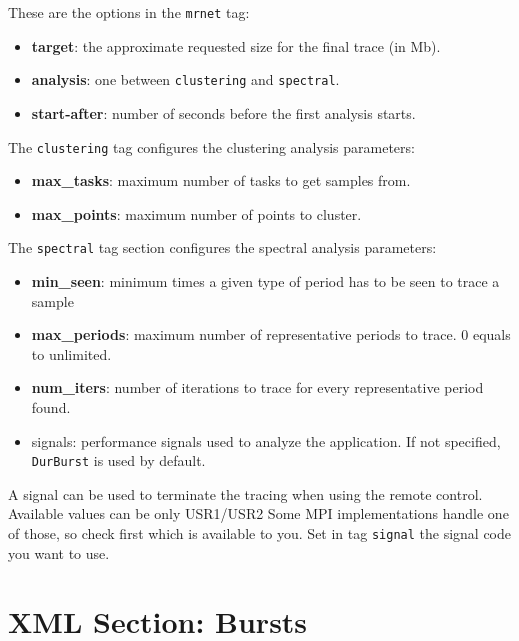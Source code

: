 These are the options in the {\tt mrnet} tag:

\begin{itemize}
 \item {\bf target}: the approximate requested size for the final trace (in Mb).
 \item {\bf analysis}: one between {\tt clustering} and {\tt spectral}.
 \item {\bf start-after}: number of seconds before the first analysis starts.
\end{itemize}

The {\tt clustering} tag configures the clustering analysis parameters:
\begin{itemize}
 \item {\bf max\_tasks}: maximum number of tasks to get samples from.
 \item {\bf max\_points}: maximum number of points to cluster.
\end{itemize}

The {\tt spectral} tag section configures the spectral analysis parameters:
\begin{itemize}
 \item {\bf min\_seen}: minimum times a given type of period has to be seen to trace a sample
 \item {\bf max\_periods}: maximum number of representative periods to trace. 0 equals to unlimited.
 \item {\bf num\_iters}: number of iterations to trace for every representative period found.
 \item {signals}: performance signals used to analyze the application. If not specified, {\tt DurBurst} is used by default.
\end{itemize}

A signal can be used to terminate the tracing when using the remote control. Available values can be only USR1/USR2 Some MPI implementations handle one of those, so check first which is available to you. Set in tag {\tt signal} the signal code you want to use.


\section{XML Section: Bursts}\label{sec:XMLSectionBursts}



